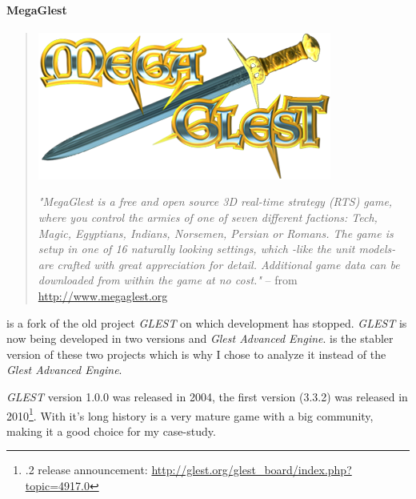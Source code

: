 \paragraph{MegaGlest}
\begin{quote}
\begin{center}\includegraphics[scale=0.5]{pics/glestlogo}\end{center}
\textit{"MegaGlest is a free and open source 3D real-time strategy (RTS) game, where you control the armies of one of
seven different factions: Tech, Magic, Egyptians, Indians, Norsemen, Persian or Romans. The game is setup in one of 16
naturally looking settings, which -like the unit models- are crafted with great appreciation for detail. Additional game
data can be downloaded from within the game at no cost."} -- from \url{http://www.megaglest.org}
\end{quote}

\GLEST{} is a fork of the old project \textit{GLEST} on which development has stopped. \textit{GLEST} is now being
developed in two versions \GLEST{} and \textit{Glest Advanced Engine}. \GLEST{} is the stabler version of these two
projects which is why I chose to analyze it instead of the \textit{Glest Advanced Engine}.

\textit{GLEST} version 1.0.0 was released in 2004, the first \GLEST{} version (3.3.2) was released in
2010\footnote{.2 release announcement: \url{http://glest.org/glest_board/index.php?topic=4917.0}}. With it's
long history \GLEST{} is a very mature game with a big community, making it a good choice for my case-study.

